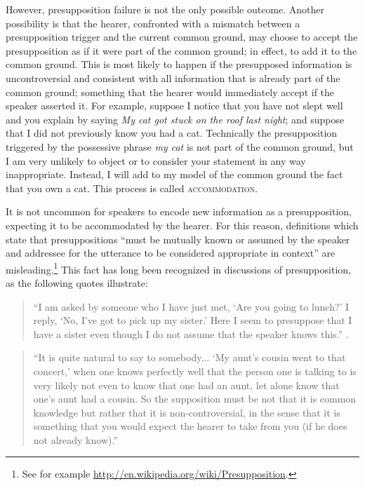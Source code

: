 However, presupposition failure is not the only possible outcome. Another possibility is that the hearer, confronted with a mismatch between a presupposition trigger and the current common ground, may choose to accept the presupposition as if it were part of the common ground; in effect, to add it to the common ground. This is most likely to happen if the presupposed information is uncontroversial and consistent with all information that is already part of the common ground; something that the hearer would immediately accept if the speaker asserted it. For example, suppose I notice that you have not slept well and you explain by saying \textit{My cat got stuck on the roof last night}; and suppose that I did not previously know you had a cat. Technically the presupposition triggered by the possessive phrase \textit{my cat} is not part of the common ground, but I am very unlikely to object or to consider your statement in any way inappropriate. Instead, I will add to my model of the common ground the fact that you own a cat. This process is called \textsc{accommodation}.



It is not uncommon for speakers to encode new information as a presupposition, expecting it to be accommodated by the hearer. For this reason, definitions which state that presuppositions “must be mutually known or assumed by the speaker and addressee for the utterance to be considered appropriate in context” are misleading.\footnote{See for example \url{http://en.wikipedia.org/wiki/Presupposition}.} This fact has long been recognized in discussions of presupposition, as the following quotes illustrate:


\begin{quote}
“I am asked by someone who I have just met, ‘Are you going to lunch?’ I reply, ‘No, I’ve got to pick up my sister.’ Here I seem to presuppose that I have a sister even though I do not assume that the speaker knows this.” \citep[202]{Stalnaker1974}. 
\end{quote}

\begin{quote}
“It is quite natural to say to somebody... ‘My aunt’s cousin went to that concert,’ when one knows perfectly well that the person one is talking to is very likely not even to know that one had an aunt, let alone know that one’s aunt had a cousin. So the supposition must be not that it is common knowledge but rather that it is non-controversial, in the sense that it is something that you would expect the hearer to take from you (if he does not already know).” \citep[190]{Grice1981}
\end{quote}

